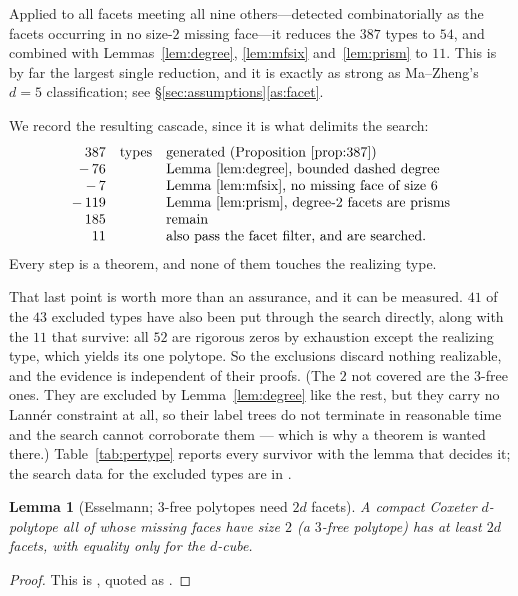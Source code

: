 \documentclass[11pt,reqno]{amsart}
\theoremstyle{plain}
\newtheorem{lemma}[theorem]{Lemma}
\theoremstyle{definition}
\newcommand{\NumTypes}{387}
\newcommand{\NumSurvivors}{54}
\newcommand{\NumSearched}{52}
\newcommand{\NumDegKilled}{76}
\newcommand{\NumBigMF}{7}
\newcommand{\NumPrism}{119}
\newcommand{\NumAfterComb}{185}
\newcommand{\NumRequired}{11}
\newcommand{\NumRedundant}{43}
\newcommand{\NumRedundantSearched}{41}
\newcommand{\NumThreeFree}{2}
\begin{document}
Applied to all facets meeting all nine others---detected
combinatorially as the facets occurring in no size-$2$ missing face---it reduces
the $\NumTypes$ types to $\NumSurvivors$, and combined with
Lemmas~\ref{lem:degree}, \ref{lem:mfsix} and~\ref{lem:prism} to $\NumRequired$. This is by far the
largest single reduction, and it is exactly as strong as Ma--Zheng's $d=5$
classification; see \S\ref{sec:assumptions}\ref{as:facet}.

We record the resulting cascade, since it is what delimits the search:
\[
\begin{array}{rcl}
\NumTypes &\text{types}& \text{generated (Proposition~\ref{prop:387})}\\
-\,\NumDegKilled && \text{Lemma~\ref{lem:degree}, bounded dashed degree}\\
-\,\NumBigMF && \text{Lemma~\ref{lem:mfsix}, no missing face of size }6\\
-\,\NumPrism && \text{Lemma~\ref{lem:prism}, degree-2 facets are prisms}\\
\NumAfterComb && \text{remain}\\
\NumRequired && \text{also pass the facet filter, and are searched.}
\end{array}
\]
Every step is a theorem, and none of them touches the realizing type.

That last point is worth more than an assurance, and it can be measured.
$\NumRedundantSearched$ of the $\NumRedundant$ excluded types have also been put
through the search directly, along with the $\NumRequired$ that survive: all
$\NumSearched$ are rigorous zeros by exhaustion except the realizing type, which
yields its one polytope. So the exclusions discard nothing realizable, and the
evidence is independent of their proofs. (The $\NumThreeFree$ not covered are the
$3$-free ones. They are excluded by Lemma~\ref{lem:degree} like the rest, but they
carry no Lann\'er constraint at all, so their label trees do not terminate in
reasonable time and the search cannot corroborate them --- which is why a theorem is
wanted there.) Table~\ref{tab:pertype} reports every
survivor with the lemma that decides it; the search data for the excluded types are
in \cite{Repo}.

\begin{lemma}[Esselmann; $3$-free polytopes need $2d$ facets]
\label{lem:esselmann}
A compact Coxeter $d$-polytope all of whose missing faces have size $2$ (a
\emph{$3$-free} polytope) has at least $2d$ facets, with equality only for the
$d$-cube.
\end{lemma}
\begin{proof}
This is \cite[Lemma~6.7]{Esselmann1994}, quoted as
\cite[Lemma~10.6]{Burcroff2024}.
\end{proof}
\end{document}
